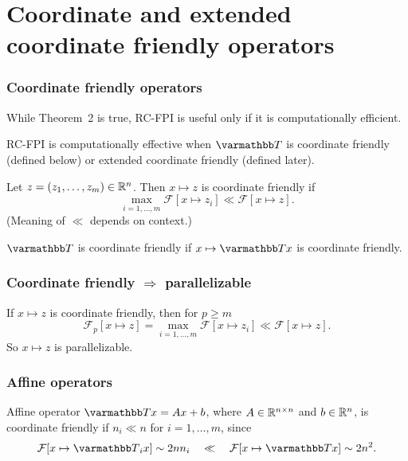 \documentclass[10pt,mathserif]{beamer}
\begin{document}
\section{Coordinate and extended coordinate friendly operators}

\begin{frame}
\frametitle{Coordinate friendly operators}

While Theorem~2 is true, RC-FPI is useful only if it is computationally efficient.
\medskip

RC-FPI is computationally effective when $\opT$ is coordinate friendly (defined below) or extended coordinate friendly (defined later).

\vspace{0.2in}\pause

Let $z=(z_1,\dots,z_m)\in\mathbb{R}^n$.
Then $x\mapsto z$ is coordinate friendly if
\[
\max_{i=1,\dots,m}
\mathcal{F}[x\mapsto z_i]
\ll
\mathcal{F}[x\mapsto z].
\]
(Meaning of $\ll$ depends on context.)

\vspace{0.2in}
$\opT$ is coordinate friendly if  $x\mapsto \opT x$ is coordinate friendly.


\end{frame}

\begin{frame}
\frametitle{Coordinate friendly $\Rightarrow$ parallelizable}
If $x\mapsto z$ is coordinate friendly, then for $p\ge m$
\[
\mathcal{F}_p[x\mapsto 
z]
=
\max_{i=1,\dots,m}
\mathcal{F}[x\mapsto z_i]
\ll
\mathcal{F}[x\mapsto 
z].
\]
So $x\mapsto z$ is parallelizable.



\end{frame}



\begin{frame}
\frametitle{Affine operators}
Affine operator $\opT x = Ax+b$, where $A\in \mathbb{R}^{n\times n}$ and $b\in \mathbb{R}^n$, is coordinate friendly if $n_i\ll n$ for $i=1,\dots,m$, since
\begin{gather*}
 \mathcal{F}[x\mapsto \opT_i x]\sim 2nn_i
 \quad\ll\quad
\mathcal{F}[x\mapsto \opT x]\sim 2n^2.
\end{gather*}
\end{frame}
\end{document}
